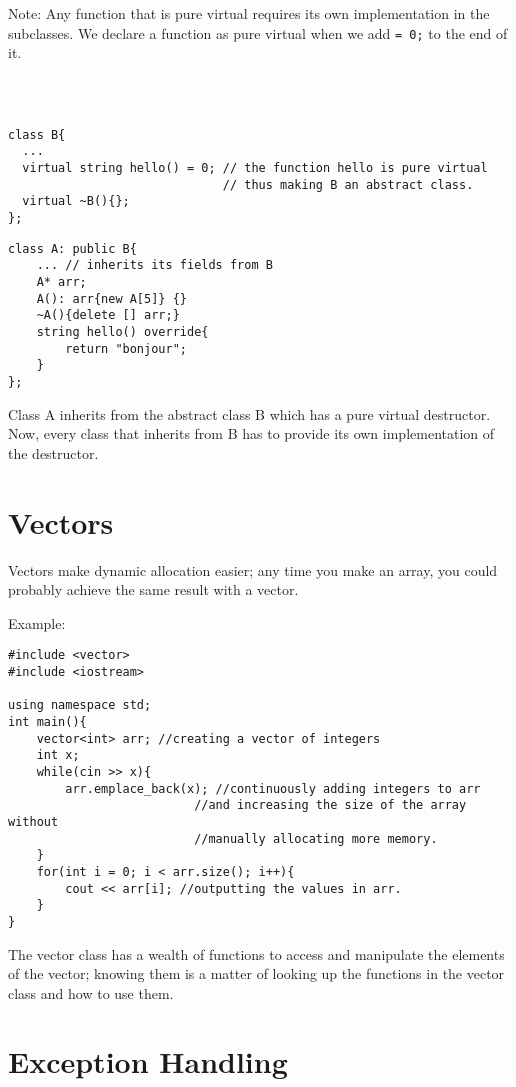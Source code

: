 \documentclass{article}
\begin{document}
Note: Any function that is pure virtual requires its own implementation in the subclasses. We declare a function as pure virtual when we add \texttt{= 0;} to the end of it.

\begin{verbatim}



class B{
  ...
  virtual string hello() = 0; // the function hello is pure virtual
                              // thus making B an abstract class.
  virtual ~B(){};
};
\end{verbatim}
\newpage
\begin{verbatim}
class A: public B{
    ... // inherits its fields from B
    A* arr;
    A(): arr{new A[5]} {}
    ~A(){delete [] arr;}
    string hello() override{
        return "bonjour";
    }
};

\end{verbatim}

Class A inherits from the abstract class B which has a pure virtual destructor. Now, every class that inherits from B has to provide its own implementation of the destructor.

\section{Vectors}

Vectors make dynamic allocation easier; any time you make an array, you could probably achieve the same result with a vector.

Example:
\begin{verbatim}
#include <vector>
#include <iostream>

using namespace std;
int main(){
    vector<int> arr; //creating a vector of integers
    int x;
    while(cin >> x){
        arr.emplace_back(x); //continuously adding integers to arr
                          //and increasing the size of the array without
                          //manually allocating more memory.
    }
    for(int i = 0; i < arr.size(); i++){
        cout << arr[i]; //outputting the values in arr.
    }
}

\end{verbatim}

The vector class has a wealth of functions to access and manipulate the elements of the vector; knowing them is a matter of looking up the functions in the vector class and how to use them.

\section{Exception Handling}
\end{document}
